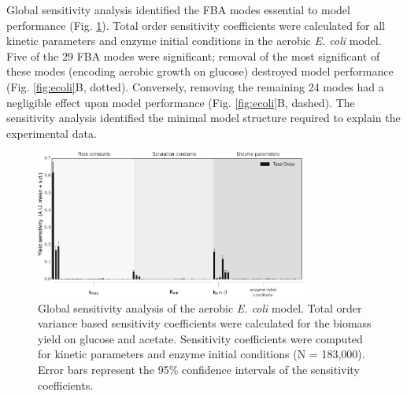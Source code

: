 \documentclass[10pt,twocolumn,twoside,final]{IEEEtran}
\begin{document}
Global sensitivity analysis identified the FBA modes essential to model performance (Fig. \ref{fig:sensitivity}).
Total order sensitivity coefficients were calculated for all kinetic parameters and enzyme initial conditions in the aerobic \textit{E. coli} model.
Five of the 29 FBA modes were significant;
removal of the most significant of these modes (encoding aerobic growth on glucose) destroyed model performance (Fig. \ref{fig:ecoli}B, dotted).
Conversely, removing the remaining 24 modes had a negligible effect upon model performance (Fig. \ref{fig:ecoli}B, dashed).
The sensitivity analysis identified the minimal model structure required to explain the experimental data.

\begin{figure}[!t]\centering
\includegraphics[width=0.80\textwidth]{./figs/Fig-3-Sensitivity-Results.pdf}
\caption{Global sensitivity analysis of the aerobic \textit{E. coli} model.
Total order variance based sensitivity coefficients were calculated for the biomass yield on glucose and acetate.
Sensitivity coefficients were computed for kinetic parameters and enzyme initial conditions (N = 183,000).
Error bars represent the 95\% confidence intervals of the sensitivity coefficients.
}
\label{fig:sensitivity}
\end{figure}
\end{document}
